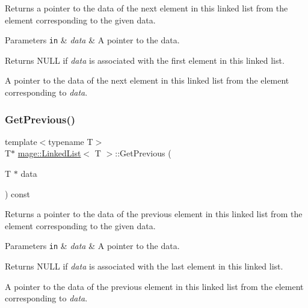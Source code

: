Returns a pointer to the data of the next element in this linked list from the element corresponding to the given data.


\begin{DoxyParams}[1]{Parameters}
\mbox{\tt in}  & {\em data} & A pointer to the data. \\
\hline
\end{DoxyParams}
\begin{DoxyReturn}{Returns}
{\ttfamily N\+U\+LL} if {\itshape data} is associated with the first element in this linked list. 

A pointer to the data of the next element in this linked list from the element corresponding to {\itshape data}. 
\end{DoxyReturn}
\hypertarget{classmage_1_1_linked_list_a48a61ad79c7a7f4d460d56867ce62cf4}{}\label{classmage_1_1_linked_list_a48a61ad79c7a7f4d460d56867ce62cf4} 
\subsubsection{\texorpdfstring{Get\+Previous()}{GetPrevious()}}
{\footnotesize\ttfamily template$<$typename T$>$ \\
T$\ast$ \hyperlink{classmage_1_1_linked_list}{mage\+::\+Linked\+List}$<$ T $>$\+::Get\+Previous (\begin{DoxyParamCaption}\item[{T $\ast$}]{data }\end{DoxyParamCaption}) const}

Returns a pointer to the data of the previous element in this linked list from the element corresponding to the given data.


\begin{DoxyParams}[1]{Parameters}
\mbox{\tt in}  & {\em data} & A pointer to the data. \\
\hline
\end{DoxyParams}
\begin{DoxyReturn}{Returns}
{\ttfamily N\+U\+LL} if {\itshape data} is associated with the last element in this linked list. 

A pointer to the data of the previous element in this linked list from the element corresponding to {\itshape data}. 
\end{DoxyReturn}
\hypertarget{classmage_1_1_linked_list_aec571022e5fa10e0afea286e4427eb89}{}\label{classmage_1_1_linked_list_aec571022e5fa10e0afea286e4427eb89} 
